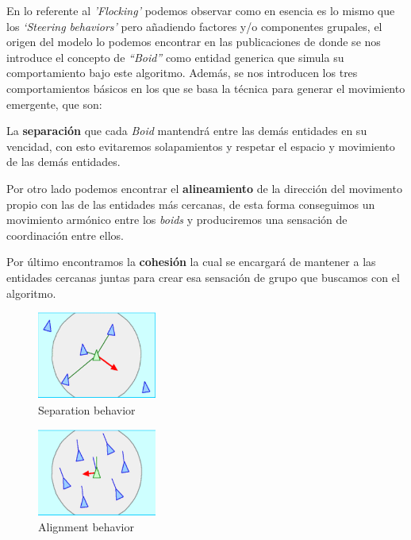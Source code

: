 En lo referente al \textit{'Flocking'} podemos observar como en esencia es lo mismo que
los \textit{`Steering behaviors'} pero añadiendo factores y/o componentes grupales,
el origen del modelo lo podemos encontrar en las publicaciones de \cite{Boids1986} donde
se nos introduce el concepto de \textit{``Boid''} como entidad generica que simula su
comportamiento bajo este algoritmo. Además, se nos introducen los tres comportamientos
básicos en los que se basa la técnica para generar el movimiento emergente, que son:

La \textbf{separación} que cada \textit{Boid} mantendrá entre
las demás entidades en su vencidad, con esto evitaremos solapamientos y respetar el
espacio y movimiento de las demás entidades.


Por otro lado podemos encontrar el \textbf{alineamiento} de la
dirección del movimento propio con las de las entidades más cercanas, de esta forma conseguimos un
movimiento armónico entre los \textit{boids} y produciremos una sensación de
coordinación entre ellos.

Por último encontramos la \textbf{cohesión} la cual se encargará de
mantener a las entidades cercanas juntas para crear esa sensación de grupo que buscamos
con el algoritmo.

\begin{figure}[ht]
\centering
\includegraphics[width=0.35\textwidth]{imagenes/marco_teo/separation.png}
\caption{Separation behavior}
\label{img:separation-b}
\end{figure}

\begin{figure}[ht]
\centering
\includegraphics[width=0.35\textwidth]{imagenes/marco_teo/alignment.png}
\caption{Alignment behavior}
\label{img:alignment-b}
\end{figure}

